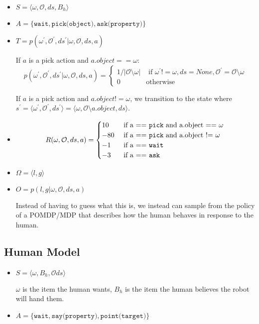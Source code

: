 \documentclass{article}
\begin{document}
\begin{itemize}
	\item $S = \langle \omega, \mathcal{O}, ds, B_h \rangle$

	\item $A = \{ \texttt{wait}, \texttt{pick(object)}, \texttt{ask(property)} \}$
	\item $T = p(\omega^\prime, \mathcal{O}^\prime, ds^\prime| \omega, \mathcal{O}, ds, a)$

		If $a$ is a pick action and $a.object == \omega$:
		\begin{equation*}
			p(\omega^\prime, \mathcal{O}^\prime, ds^\prime| \omega, \mathcal{O}, ds, a) = \begin{cases}
				1 / |\mathcal{O} \setminus \omega| & \text{ if $\omega^\prime != \omega, ds = None, \mathcal{O}^\prime = \mathcal{O}\setminus \omega$} \\
				0 & \text{otherwise}
			\end{cases}
		\end{equation*}

		If $a$ is a pick action and $a.object != \omega$, we transition to the state where $s^\prime = \langle \omega^\prime, \mathcal{O}^\prime, ds^\prime \rangle = \langle \omega, \mathcal{O} \setminus a.object, ds\rangle$. 

	\item 
		\begin{equation*}
			R(\omega, \mathcal{O}, ds, a) = 
			\begin{cases}
				10 & \text{ if a == \texttt{pick} and a.object == $\omega$} \\
				-80 & \text{ if a == \texttt{pick} and a.object != $\omega$} \\
				-1 & \text{ if a == \texttt{wait}} \\
				-3 & \text{ if a == \texttt{ask}}
			\end{cases}
		\end{equation*}
	\item $\Omega = \langle l, g \rangle$
	\item $O = p(l, g | \omega, \mathcal{O}, ds, a)$
		
		Instead of having to guess what this is, we instead can sample from the policy of a POMDP/MDP that describes how the human behaves in response to the human. 
			
\end{itemize}


\subsection{Human Model}
\begin{itemize}
	\item $S = \langle \omega, B_h, \mathcal{O} ds \rangle$

		$\omega$ is the item the human wants, $B_h$ is the item the human believes the robot will hand them. 
		\item $A = \{ \texttt{wait}, \texttt{say(property)}, \texttt{point(target)} \}$

\end{itemize}
\end{document}
